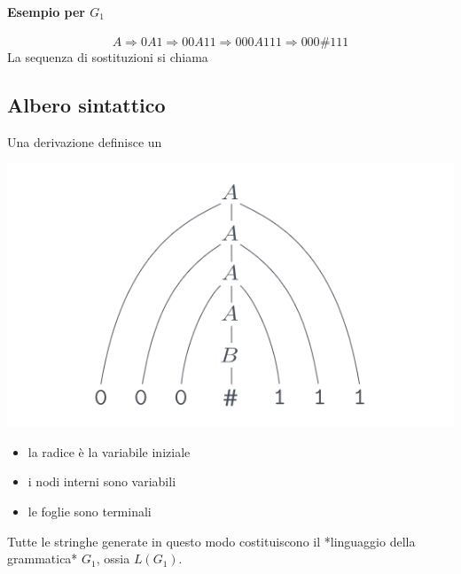 \paragraph{Esempio per $G_1$}
$$A\Rightarrow 0A1\Rightarrow 00A11 \Rightarrow 000A111\Rightarrow 000\#111$$
La sequenza di sostituzioni si chiama 

\subsection{Albero sintattico}
Una derivazione definisce un \\
\begin{center}
	\includegraphics[scale=0.5]{img/alberosintattico.png} 
\end{center}
\begin{itemize}
	\item la radice è la variabile iniziale
	\item i nodi interni sono variabili 
	\item le foglie sono terminali 
\end{itemize}

Tutte le stringhe generate in questo modo costituiscono il *linguaggio della grammatica* $G_1$, ossia $L(G_1)$. 

